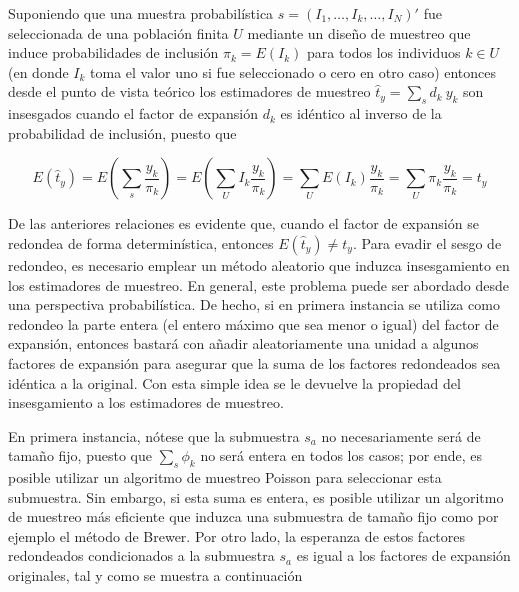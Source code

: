 \documentclass[
  10pt,
  spanish,
]{book}
\begin{document}
Suponiendo que una muestra probabilística \(s=(I_1,\ldots,I_k,\ldots,I_N)'\) fue seleccionada de una población finita \(U\) mediante un diseño de muestreo que induce probabilidades de inclusión \(\pi_k= E(I_k)\) para todos los individuos \(k \in U\) (en donde \(I_k\) toma el valor uno si fue seleccionado o cero en otro caso) entonces desde el punto de vista teórico los estimadores de muestreo \(\hat t_y = \sum_s d_k \ y_k\) son insesgados cuando el factor de expansión \(d_k\) es idéntico al inverso de la probabilidad de inclusión, puesto que

\[
E(\hat t_y)
= E \left( \sum_s \frac{y_k}{\pi_k} \right)
= E \left(\sum_U I_k \frac{y_k}{\pi_k} \right)
= \sum_U E(I_k)  \frac{y_k}{\pi_k}
= \sum_U \pi_k \frac{y_k}{\pi_k} = t_y
\]

De las anteriores relaciones es evidente que, cuando el factor de expansión se redondea de forma determinística, entonces \(E(\hat t_y) \neq t_y\). Para evadir el sesgo de redondeo, es necesario emplear un método aleatorio que induzca insesgamiento en los estimadores de muestreo. En general, este problema puede ser abordado desde una perspectiva probabilística. De hecho, si en primera instancia se utiliza como redondeo la parte entera (el entero máximo que sea menor o igual) del factor de expansión, entonces bastará con añadir aleatoriamente una unidad a algunos factores de expansión para asegurar que la suma de los factores redondeados sea idéntica a la original. Con esta simple idea se le devuelve la propiedad del insesgamiento a los estimadores de muestreo.

\begin{algorithm}
\DontPrintSemicolon
{}
\;
\end{algorithm}

En primera instancia, nótese que la submuestra \(s_a\) no necesariamente será de tamaño fijo, puesto que \(\sum_s\phi_k\) no será entera en todos los casos; por ende, es posible utilizar un algoritmo de muestreo Poisson \citep[sección 4.1]{Gutierrez_2016} para seleccionar esta submuestra. Sin embargo, si esta suma es entera, es posible utilizar un algoritmo de muestreo más eficiente que induzca una submuestra de tamaño fijo como por ejemplo el método de Brewer. Por otro lado, la esperanza de estos factores redondeados condicionados a la submuestra \(s_a\) es igual a los factores de expansión originales, tal y como se muestra a continuación
\end{document}
